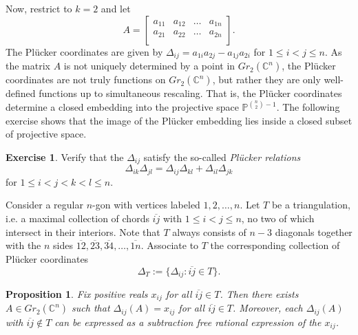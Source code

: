 \documentclass{amsart}
\newtheorem{proposition}[theorem]{Proposition}
\theoremstyle{definition}
\newtheorem{exercise}[theorem]{Exercise}
\theoremstyle{remark}
\numberwithin{equation}{section}
\newcommand{\CC}{{\mathbb{C}}}
\newcommand{\PP}{{\mathbb{P}}}
\begin{document}
		Now, restrict to $k=2$ and let 
		\begin{displaymath}
			A = \left[ \begin{array}{cccc}
			a_{11} & a_{12} & \ldots & a_{1n} \\
			a_{21} & a_{22} & \ldots & a_{2n} \\
			\end{array} \right].
		\end{displaymath}
		The Pl\"ucker coordinates are given by $\Delta_{ij} = a_{1i}a_{2j} - a_{1j}a_{2i}$ for $1 \leq i < j \leq n$.  As the matrix $A$ is not uniquely determined by a point in $Gr_2(\CC^n)$, the Pl\"ucker coordinates are not truly functions on $Gr_2(\CC^n)$, but rather they are only well-defined functions up to simultaneous rescaling.  That is, the Pl\"ucker coordinates determine a closed embedding into the projective space $\PP^{{n\choose 2}-1}$.  The following exercise shows that the image of the Pl\"ucker embedding lies inside a closed subset of projective space.
		\begin{exercise}
			Verify that the $\Delta_{ij}$ satisfy the so-called \emph{Pl\"ucker relations}
			\begin{equation}\label{eq:short plucker special}
				\Delta_{ik}\Delta_{jl} = \Delta_{ij}\Delta_{kl} + \Delta_{il}\Delta_{jk}
			\end{equation}
			for $1 \leq i < j < k < l \leq n$.
		\end{exercise}
		
		Consider a regular $n$-gon with vertices labeled $1,2,\ldots, n$.  Let $T$ be a triangulation, i.e. a maximal collection of chords $\overline{ij}$ with $1 \leq i < j \leq n$, no two of which intersect in their interiors.  Note that $T$ always consists of $n-3$ diagonals together with the $n$ sides $\overline{12}, \overline{23}, \overline{34}, \ldots, \overline{1n}$.  Associate to $T$ the corresponding collection of Pl\"ucker coordinates
		\begin{displaymath}
			\Delta_T := \{\Delta_{ij} : \overline{ij} \in T\}.
		\end{displaymath}
    \setcounter{subproposition}{1}
		\begin{proposition} \label{prop:Gr2n}
		Fix positive reals $x_{ij}$ for all $\overline{ij} \in T$.  Then there exists $A \in Gr_2(\CC^n)$ such that $\Delta_{ij}(A) = x_{ij}$ for all $\overline{ij} \in T$.  Moreover, each $\Delta_{ij}(A)$ with $\overline{ij} \notin T$ can be expressed as a subtraction free rational expression of the $x_{ij}$.
		\end{proposition}
		
\end{document}
